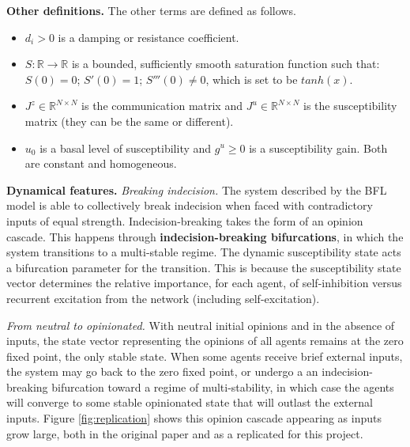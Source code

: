 \documentclass[]{article}
\begin{document}
\textbf{Other definitions.} The other terms are defined as follows. \begin{itemize}
	\item $d_{i} > 0$ is a damping or resistance coefficient. 
	\item $S: \mathbb{R} \rightarrow \mathbb{R}$ is a bounded, sufficiently smooth saturation function such that: $S(0)=0$; $S'(0)=1$; $S'''(0)\neq0$, which is set to be $tanh(x)$.
	\item $J^z \in \mathbb{R}^{N \times N}$ is the communication matrix and $J^u \in \mathbb{R}^{N \times N}$ is the susceptibility matrix (they can be the same or different).
	\item $u_0$ is a basal level of susceptibility and $g^u \geq 0$ is a susceptibility gain. Both are constant and homogeneous.
\end{itemize}

\textbf{Dynamical features.} \textit{Breaking indecision.} The system described by the BFL model is able to collectively break indecision when faced with contradictory inputs of equal strength. Indecision-breaking takes the form of an opinion cascade. This happens through \textbf{indecision-breaking bifurcations}, in which the system transitions to a multi-stable regime. The dynamic susceptibility state acts a bifurcation parameter for the transition. This is because the susceptibility state vector determines the relative importance, for each agent, of self-inhibition versus recurrent excitation from the network (including self-excitation).

\textit{From neutral to opinionated.} With neutral initial opinions and in the absence of inputs, the state vector representing the opinions of all agents remains at the zero fixed point, the only stable state. When some agents receive brief external inputs, the system may go back to the zero fixed point, or undergo a an indecision-breaking bifurcation toward a regime of multi-stability, in which case the agents will converge to some stable opinionated state that will outlast the external inputs. Figure \ref{fig:replication} shows this opinion cascade appearing as inputs grow large, both in the original paper and as a replicated for this project.
\end{document}
